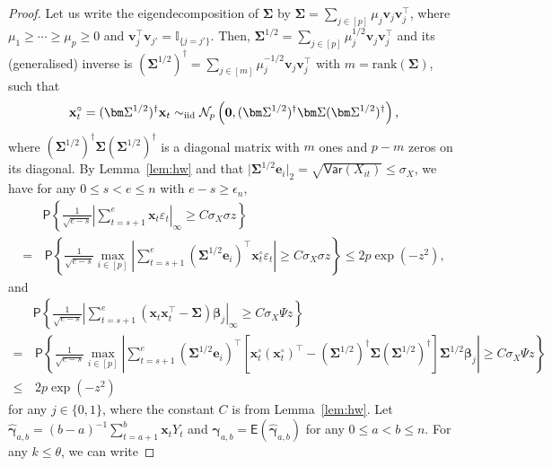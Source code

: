 \documentclass[11pt, a4paper]{article}
\newcommand{\mbf}{\mathbf}
\newcommand{\mc}{\mathcal}
\newcommand{\eps}{\epsilon}
\newcommand{\vep}{\varepsilon}
\renewcommand{\l}{\left}
\renewcommand{\r}{\right}
\def\wh{\widehat}
\newcommand{\cp}{\theta}
\newcommand{\E}[0]{\mathsf{E}}
\newcommand{\Var}[0]{\mathsf{Var}}
\newcommand{\p}{\mathsf{P}}
\newcommand{\iid}{\text{\upshape iid}}
\newcommand{\nn}{\nonumber}
\theoremstyle{definition}
\theoremstyle{definition}
\theoremstyle{definition}
\theoremstyle{definition}
\theoremstyle{definition}
\theoremstyle{remark}
\theoremstyle{definition}
\theoremstyle{definition}
\theoremstyle{definition}
\begin{document}
\begin{proof}
Let us write the eigendecomposition of $\bm\Sigma$ by $\bm\Sigma = \sum_{j \in [p]} \mu_j \mbf v_j \mbf v_j^\top$, where $\mu_1 \ge \cdots \ge \mu_p \ge 0$ and $\mbf v_j^\top \mbf v_{j'} = \mathbb{I}_{\{j = j'\}}$. 
Then, $\bm\Sigma^{1/2} = \sum_{j \in [p]} \mu_j^{1/2} \mbf v_j \mbf v_j^\top$ and its (generalised) inverse is $(\bm\Sigma^{1/2})^\dagger = \sum_{j \in [m]} \mu_j^{-1/2} \mbf v_j \mbf v_j^\top$ with $m = \text{rank}(\bm\Sigma)$, such that
\begin{align}
\label{eq:x:circ}
\mbf x^\circ_t = (\bm\Sigma^{1/2})^\dagger \mbf x_t \sim_{\iid} \mc N_p\l( \mbf 0, (\bm\Sigma^{1/2})^\dagger \bm\Sigma (\bm\Sigma^{1/2})^\dagger \r),
\end{align}
where $(\bm\Sigma^{1/2})^\dagger \bm\Sigma (\bm\Sigma^{1/2})^\dagger$ is a diagonal matrix with $m$ ones and $p - m$ zeros on its diagonal.
By Lemma~\ref{lem:hw} and that $\vert \bm\Sigma^{1/2} \mbf e_i \vert_2 = \sqrt{\Var(X_{it})} \le \sigma_X$,
we have for any $0 \le s < e \le n$ with $e - s \ge \eps_n$,
\begin{align}
& \p\l\{ \frac{1}{\sqrt{e - s}} \l\vert \sum_{t = s + 1}^e \mbf x_t \vep_t \r\vert_\infty \ge C \sigma_X \sigma z \r\}
\nn \\
=& \, \p\l\{ \frac{1}{\sqrt{e - s}} \max_{i \in [p]} \l\vert \sum_{t = s + 1}^e ( \bm\Sigma^{1/2} \mbf e_i )^\top \mbf x^\circ_t \vep_t \r\vert \ge C \sigma_X \sigma z \r\}
\le 2p \exp( - z^2),
\label{eq:xe:bound}
\end{align}
and
\begin{align}
& \p\l\{ \frac{1}{\sqrt{e - s}} \l\vert \sum_{t = s + 1}^e (\mbf x_t \mbf x_t^\top - \bm\Sigma) \bm\beta_j \r\vert_\infty \ge C \sigma_X \Psi z \r\}
\nn \\
=& \, \p\l\{ \frac{1}{\sqrt{e - s}} \max_{i \in [p]} \l\vert \sum_{t = s + 1}^e (\bm\Sigma^{1/2} \mbf e_i)^\top \l[ \mbf x^\circ_t (\mbf x^\circ_t)^\top - (\bm\Sigma^{1/2})^\dagger \bm\Sigma (\bm\Sigma^{1/2})^\dagger \r] \bm\Sigma^{1/2} \bm\beta_j \r\vert \ge C \sigma_X \Psi z \r\}
\nn \\
\le& \, 2p \exp( - z^2)
\label{eq:xx:bound}
\end{align}
for any $j \in \{0, 1\}$, where the constant $C$ is from Lemma~\ref{lem:hw}.
Let $\wh{\bm\gamma}_{a, b} = (b - a)^{-1} \sum_{t = a + 1}^b \mbf x_tY_t$ and $\bm\gamma_{a, b} = \E(\wh{\bm\gamma}_{a, b})$ for any $0 \le a < b \le n$.
For any $k \le \cp$, we can write

\end{proof}
\end{document}
